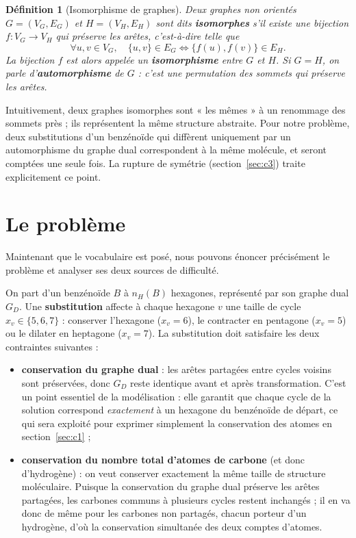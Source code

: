 \documentclass[11pt,a4paper]{article}
\newcommand{\GD}{\ensuremath{G_D}}                 %
\newtheorem{definition}{Définition}
\begin{document}
\begin{definition}[Isomorphisme de graphes]
Deux graphes non orientés $G = (V_G, E_G)$ et $H = (V_H, E_H)$ sont
dits \textbf{isomorphes} s'il existe une bijection $f : V_G \to V_H$
qui préserve les arêtes, c'est-à-dire telle que
\[
  \forall u, v \in V_G,\quad \{u, v\} \in E_G \iff \{f(u), f(v)\} \in E_H .
\]
La bijection $f$ est alors appelée un \textbf{isomorphisme} entre $G$
et $H$. Si $G = H$, on parle d'\textbf{automorphisme} de $G$ : c'est
une permutation des sommets qui préserve les arêtes.
\end{definition}

Intuitivement, deux graphes isomorphes sont « les mêmes » à un
renommage des sommets près ; ils représentent la même structure
abstraite. Pour notre problème, deux substitutions d'un benzénoïde qui
diffèrent uniquement par un automorphisme du graphe dual correspondent
à la même molécule, et seront comptées une seule fois. La rupture de
symétrie (section~\ref{sec:c3}) traite explicitement ce point.

\section{Le problème}
\label{sec:probleme}

Maintenant que le vocabulaire est posé, nous pouvons énoncer précisément le
problème et analyser ses deux sources de difficulté.

On part d'un benzénoïde $B$ à $n_H(B)$ hexagones, représenté par son
graphe dual \GD{}. Une \textbf{substitution} affecte à chaque hexagone
$v$ une taille de cycle $x_v \in \{5, 6, 7\}$ : conserver l'hexagone
($x_v = 6$), le contracter en pentagone ($x_v = 5$) ou le dilater en
heptagone ($x_v = 7$). La substitution doit satisfaire les deux contraintes suivantes :
\begin{itemize}[leftmargin=1.4em]
  \item \textbf{conservation du graphe dual} : les arêtes partagées entre
    cycles voisins sont préservées, donc \GD{} reste identique avant et
    après transformation. C'est un point essentiel de la modélisation :
    elle garantit que chaque cycle de la solution correspond
    \emph{exactement} à un hexagone du benzénoïde de départ, ce qui sera
    exploité pour exprimer simplement la conservation des atomes en
    section~\ref{sec:c1} ;
  \item \textbf{conservation du nombre total d'atomes de carbone} (et
    donc d'hydrogène) : on veut conserver exactement la même taille de
    structure moléculaire. Puisque la conservation du graphe dual
    préserve les arêtes partagées, les carbones communs à plusieurs
    cycles restent inchangés ; il en va donc de même pour les carbones
    non partagés, chacun porteur d'un hydrogène, d'où la conservation
    simultanée des deux comptes d'atomes.
\end{itemize}
\end{document}
